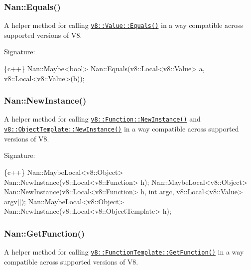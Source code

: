 \label{_api_nan_equals}%
 \subsubsection*{Nan\+::\+Equals()}

A helper method for calling \href{https://v8docs.nodesource.com/io.js-3.0/dc/d0a/classv8_1_1_value.html#a0d9616ab2de899d4e3047c30a10c9285}{\tt {\ttfamily v8\+::\+Value\+::\+Equals()}} in a way compatible across supported versions of V8.

Signature\+:


\begin{DoxyCode}
\{c++\}
Nan::Maybe<bool> Nan::Equals(v8::Local<v8::Value> a, v8::Local<v8::Value>(b));
\end{DoxyCode}


\label{_api_nan_new_instance}%
 \subsubsection*{Nan\+::\+New\+Instance()}

A helper method for calling \href{https://v8docs.nodesource.com/io.js-3.0/d5/d54/classv8_1_1_function.html#a691b13f7a553069732cbacf5ac8c62ec}{\tt {\ttfamily v8\+::\+Function\+::\+New\+Instance()}} and \href{https://v8docs.nodesource.com/io.js-3.0/db/d5f/classv8_1_1_object_template.html#ad605a7543cfbc5dab54cdb0883d14ae4}{\tt {\ttfamily v8\+::\+Object\+Template\+::\+New\+Instance()}} in a way compatible across supported versions of V8.

Signature\+:


\begin{DoxyCode}
\{c++\}
Nan::MaybeLocal<v8::Object> Nan::NewInstance(v8::Local<v8::Function> h);
Nan::MaybeLocal<v8::Object> Nan::NewInstance(v8::Local<v8::Function> h, int argc, v8::Local<v8::Value>
       argv[]);
Nan::MaybeLocal<v8::Object> Nan::NewInstance(v8::Local<v8::ObjectTemplate> h);
\end{DoxyCode}


\label{_api_nan_get_function}%
 \subsubsection*{Nan\+::\+Get\+Function()}

A helper method for calling \href{https://v8docs.nodesource.com/io.js-3.0/d8/d83/classv8_1_1_function_template.html#a56d904662a86eca78da37d9bb0ed3705}{\tt {\ttfamily v8\+::\+Function\+Template\+::\+Get\+Function()}} in a way compatible across supported versions of V8.

